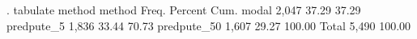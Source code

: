 . tabulate method
{\smallskip}
      method {\VBAR}      Freq.     Percent        Cum.
       modal {\VBAR}      2,047       37.29       37.29
  predpute_5 {\VBAR}      1,836       33.44       70.73
 predpute_50 {\VBAR}      1,607       29.27      100.00
       Total {\VBAR}      5,490      100.00
{\smallskip}
